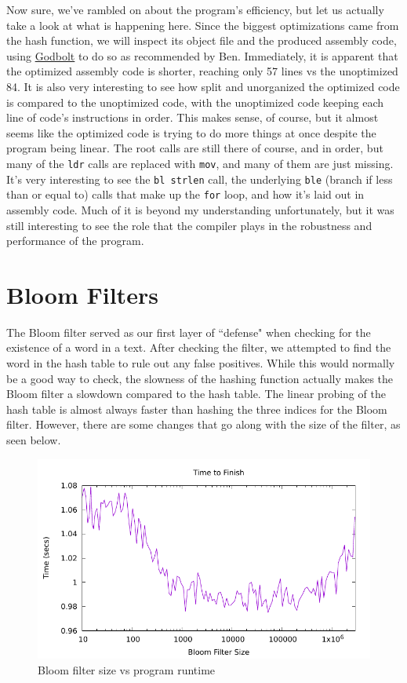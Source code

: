 \documentclass[12pt]{article}
\begin{document}
Now sure, we've rambled on about the program's efficiency, but let us actually take a look at what is happening here. Since the biggest optimizations came from the hash function, we will inspect its object file and the produced assembly code, using \href{https://godbolt.org/z/xafdr34hc}{Godbolt} to do so as recommended by Ben. Immediately, it is apparent that the optimized assembly code is shorter, reaching only 57 lines vs the unoptimized 84. It is also very interesting to see how split and unorganized the optimized code is compared to the unoptimized code, with the unoptimized code keeping each line of code's instructions in order. This makes sense, of course, but it almost seems like the optimized code is trying to do more things at once despite the program being linear. The root calls are still there of course, and in order, but many of the \verb|ldr| calls are replaced with \verb|mov|, and many of them are just missing. It's very interesting to see the \verb|bl strlen| call, the underlying \verb|ble| (branch if less than or equal to) calls that make up the \verb|for| loop, and how it's laid out in assembly code. Much of it is beyond my understanding unfortunately, but it was still interesting to see the role that the compiler plays in the robustness and performance of the program.

\section{Bloom Filters}
The Bloom filter served as our first layer of ``defense" when checking for the existence of a word in a text. After checking the filter, we attempted to find the word in the hash table to rule out any false positives. While this would normally be a good way to check, the slowness of the hashing function actually makes the Bloom filter a slowdown compared to the hash table. The linear probing of the hash table is almost always faster than hashing the three indices for the Bloom filter. However, there are some changes that go along with the size of the filter, as seen below.

\begin{figure}[H]\begin{centering}
\includegraphics{plots/bf-time.pdf}\caption{Bloom filter size vs program runtime}
\end{centering}\end{figure}
\end{document}
